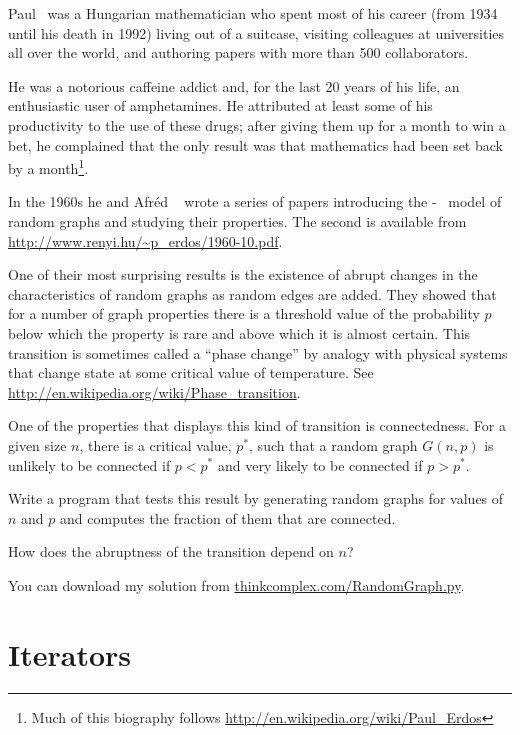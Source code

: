 \documentclass[10pt]{book}
\begin{document}
Paul \Erdos~was a Hungarian mathematician who spent most
of his career (from 1934 until his death in 1992) living out
of a suitcase, visiting colleagues at universities all over the
world, and authoring papers with more than 500 collaborators.

He was a notorious caffeine addict and, for the last 20 years of his
life, an enthusiastic user of amphetamines.  He attributed at least
some of his productivity to the use of these drugs; after giving them
up for a month to win a bet, he complained that the only result
was that mathematics had
been set back by a month\footnote{Much of this biography follows
\url{http://en.wikipedia.org/wiki/Paul_Erdos}}.

In the 1960s he and Afr\'{e}d \Renyi~ wrote a series of papers
introducing the \Erdos-\Renyi~
model of random graphs and studying their properties.
The second is available from \url{http://www.renyi.hu/~p_erdos/1960-10.pdf}.

One of their most surprising results is the existence of
abrupt changes in the characteristics of random graphs as
random edges are added.  They showed that for a number of
graph properties there is a threshold value of the probability
$p$ below which the property is rare and above which it
is almost certain.  This transition is sometimes called
a ``phase change'' by analogy with physical systems that
change state at some critical value of temperature.
See \url{http://en.wikipedia.org/wiki/Phase_transition}.


\begin{exercise}

One of the properties that displays this kind of transition is
connectedness.  For a given size $n$, there is a critical value,
$p^*$, such that a random graph $G(n, p)$ is unlikely to be connected
if $p < p^*$ and very likely to be connected if $p > p^*$.

Write a program that tests this result by generating random graphs for
values of $n$ and $p$ and computes the fraction of them that
are connected.

How does the abruptness of the transition depend on $n$?

You can download my solution from
\url{thinkcomplex.com/RandomGraph.py}.

\end{exercise}


\section{Iterators}
\end{document}

